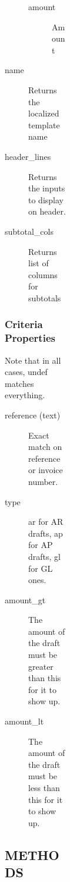 \begin{description}
\begin{description}
\begin{description}
\begin{description}
\begin{description}
\begin{description}
\begin{description}
\begin{description}
\begin{description}
\begin{description}
\begin{description}
\begin{description}
\item[{amount}] \mbox{}

Amount

\end{description}

\item[{name}] \mbox{}

Returns the localized template name


\item[{header\_lines}] \mbox{}

Returns the inputs to display on header.


\item[{subtotal\_cols}] \mbox{}

Returns list of columns for subtotals

\end{description}
\subsubsection*{Criteria Properties\label{LedgerSMB::DBObject::Report::Unapproved::Drafts_Criteria_Properties}}


Note that in all cases, undef matches everything.

\begin{description}

\item[{reference (text)}] \mbox{}

Exact match on reference or invoice number.


\item[{type}] \mbox{}

ar for AR drafts, ap for AP drafts, gl for GL ones.


\item[{amount\_gt}] \mbox{}

The amount of the draft must be greater than this for it to show up.


\item[{amount\_lt}] \mbox{}

The amount of the draft must be less than this for it to show up.

\end{description}
\subsection*{METHODS\label{LedgerSMB::DBObject::Report::Unapproved::Drafts_METHODS}}
\begin{description}


\end{description}
\end{description}
\end{description}
\end{description}
\end{description}
\end{description}
\end{description}
\end{description}
\end{description}
\end{description}
\end{description}

